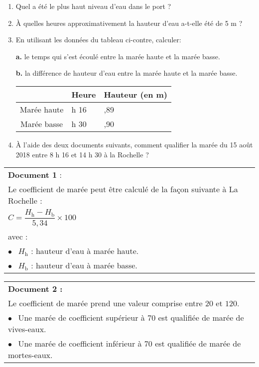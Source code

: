 \documentclass[10pt]{article}
\begin{document}
\begin{enumerate}
\item Quel a été le plus haut niveau d'eau dans le port ?
\item À quelles heures approximativement la hauteur d'eau a-t-elle été de 5 m ?
\item En utilisant les données du tableau ci-contre, calculer:

\parbox{0.43\linewidth}{
\textbf{a.} le temps qui s'est écoulé entre la marée haute et la marée basse.

\textbf{b.} la différence de hauteur d'eau entre la marée
haute et la marée basse.} \hfill
\parbox{0.55\linewidth}{\begin{tabularx}{\linewidth}{|c|*{2}{>{\centering \arraybackslash}X|}}\cline{2-3}
\multicolumn{1}{c|}{~}	&Heure	&\small Hauteur (en m)\\ \hline
Marée haute 			&8 h 16 &5,89\\ \hline
Marée basse 			&14 h 30&0,90\\ \hline
\end{tabularx}
}

\item  À l'aide des deux documents suivants, comment qualifier la marée du 15 août 2018 entre 8 h 16 et 14 h 30 à la Rochelle ?
\end{enumerate}

\parbox{0.48\linewidth}{
\begin{tabularx}{\linewidth}{|X|}\hline
\textbf{Document 1} :\\
Le coefficient de marée peut être calculé de la façon suivante à La Rochelle :\\
$C = \dfrac{H_{\text{h}} - H_{\text{b}}}{5,34} \times 100$\\
avec :\\
\hspace{1cm}$\bullet~~$ $H_{\text{h}}$ : hauteur d'eau à marée haute.\\
\hspace{1cm}$\bullet~~$ $H_{\text{b}}$  : hauteur d'eau à marée basse.\\ \hline
\end{tabularx}
}\hfill
\parbox{0.48\linewidth}{
\begin{tabularx}{\linewidth}{|X|}\hline
\textbf{Document 2 :}\\
Le coefficient de marée prend une valeur comprise entre $20$ et $120$.\\
\hspace{1cm}$\bullet~~$ Une marée de coefficient supérieur à 70 est qualifiée de marée de
vives-eaux.\\
\hspace{1cm}$\bullet~~$ Une marée de coefficient inférieur à
70 est qualifiée de marée de mortes-eaux.\\ \hline
\end{tabularx}
}
\end{document}
